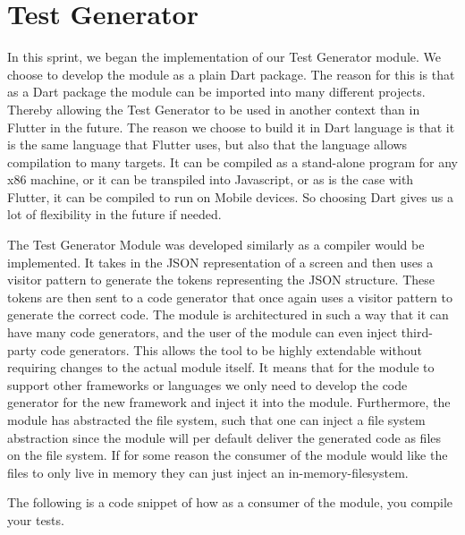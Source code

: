 \section{Test Generator}
In this sprint, we began the implementation of our Test Generator module. 
We choose to develop the module as a plain Dart package. 
The reason for this is that as a Dart package the module can be imported into many different projects.
Thereby allowing the Test Generator to be used in another context than in Flutter in the future.
The reason we choose to build it in Dart language is that it is the same language that Flutter uses, but also that the language allows compilation to many targets.
It can be compiled as a stand-alone program for any x86 machine, or it can be transpiled into Javascript, or as is the case with Flutter, it can be compiled to run on Mobile devices. 
So choosing Dart gives us a lot of flexibility in the future if needed.

The Test Generator Module was developed similarly as a compiler would be implemented.
It takes in the JSON representation of a screen and then uses a visitor pattern to generate the tokens representing the JSON structure.
These tokens are then sent to a code generator that once again uses a visitor pattern to generate the correct code.
The module is architectured in such a way that it can have many code generators, and the user of the module can even inject third-party code generators.
This allows the tool to be highly extendable without requiring changes to the actual module itself.
It means that for the module to support other frameworks or languages we only need to develop the code generator for the new framework and inject it into the module.
Furthermore, the module has abstracted the file system, such that one can inject a file system abstraction since the module will per default deliver the generated code as files on the file system. If for some reason the consumer of the module would like the files to only live in memory they can just inject an in-memory-filesystem.

The following is a code snippet of how as a consumer of the module, you compile your tests.

